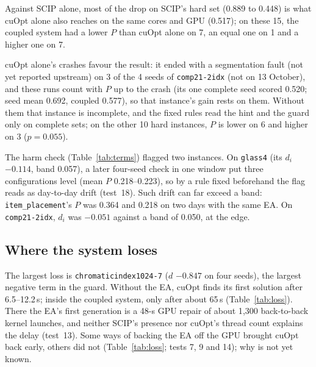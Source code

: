 Against SCIP alone, most of the drop on SCIP's hard set (0.889 to 0.448) is what cuOpt alone also reaches on the same
cores and GPU (0.517); on these 15, the coupled system had a lower $P$ than cuOpt alone on 7, an equal one on 1 and a
higher one on 7.

cuOpt alone's crashes favour the result: it ended with a segmentation fault (not yet reported upstream) on 3 of the 4
seeds of \texttt{comp21-2idx} (not on 13 October), and these runs count with $P$ up to the crash (its one complete seed scored
0.520; seed mean 0.692, coupled 0.577), so that instance's gain rests on them. Without them that instance is incomplete, and the fixed rules read the hint and
the guard only on complete sets; on the other 10 hard instances, $P$ is lower on 6 and higher on 3 ($p = 0.055$).

The harm check (Table~\ref{tab:terms}) flagged two instances. On \texttt{glass4} (its $d_i$ $-0.114$, band 0.057), a
later four-seed check in one window put three configurations level (mean $P$ 0.218--0.223), so by a rule fixed
beforehand the flag reads as day-to-day drift (test~18). Such drift can far exceed a band: \texttt{item\_placement}'s
$P$ was 0.364 and 0.218 on two days with the same EA. On \texttt{comp21-2idx}, $d_i$ was $-0.051$ against a band of
0.050, at the edge.

\subsection{Where the system loses}\label{sec:res-loss}
The largest loss is \texttt{chromaticindex1024-7} ($d$ $-0.847$ on four seeds), the largest negative term in the
guard. Without the EA, cuOpt finds its first solution after 6.5--12.2\,s; inside the coupled system, only after about 65\,s
(Table~\ref{tab:loss}). There the EA's first generation is a 48-s GPU repair of about 1{,}300 back-to-back kernel
launches, and neither SCIP's presence nor cuOpt's thread count explains the delay (test~13). Some ways of backing the EA
off the GPU brought cuOpt back early, others did not (Table~\ref{tab:loss}; tests 7, 9 and 14); why is not yet known.

